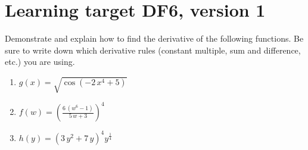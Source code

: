 \section{Learning target DF6, version 1}
\providecommand{\stxKnowl}{}\renewcommand{\stxKnowl}[1]{#1}
\providecommand{\stxOuttro}{}\renewcommand{\stxOuttro}[1]{#1}
\providecommand{\stxTitle}{}\renewcommand{\stxTitle}[1]{#1}
\renewcommand{\stxOuttro}[1]{}
\stxKnowl{
 Demonstrate and explain how to find the derivative of the following functions. Be sure to write down which derivative rules (constant multiple, sum and difference, etc.) you are using.

\begin{enumerate}
\item
\stxKnowl{
\(g(x) = \sqrt{\cos\left(-2 \, x^{4} + 5\right)}\)

\stxOuttro{
\[g ' (x) = \frac{4 \, x^{3} \sin\left(-2 \, x^{4} + 5\right)}{\sqrt{\cos\left(-2 \, x^{4} + 5\right)}}\]

}
}
\vfill
\item
\stxKnowl{
\(f(w) = \left( \frac{6 \, {\left(w^{6} - 1\right)}}{5 \, w + 3} \right)^{ 4 }\)

\stxOuttro{
\[f ' (w) = 4 \left( \frac{6 \, {\left(w^{6} - 1\right)}}{5 \, w + 3} \right)^{ 3 } \left( \frac{36 \, w^{5}}{5 \, w + 3} - \frac{30 \, {\left(w^{6} - 1\right)}}{{\left(5 \, w + 3\right)}^{2}} \right)\]

}
}
\vfill
\item
\stxKnowl{
\(h(y) = {\left(3 \, y^{2} + 7 \, y\right)}^{4} y^{\frac{1}{4}}\)

\stxOuttro{
\[h ' (y) = 4 \, {\left(3 \, y^{2} + 7 \, y\right)}^{3} {\left(6 \, y + 7\right)} y^{\frac{1}{4}} + \frac{{\left(3 \, y^{2} + 7 \, y\right)}^{4}}{4 \, y^{\frac{3}{4}}}\]

}
}
\vfill
\end{enumerate}
}

\pagebreak

